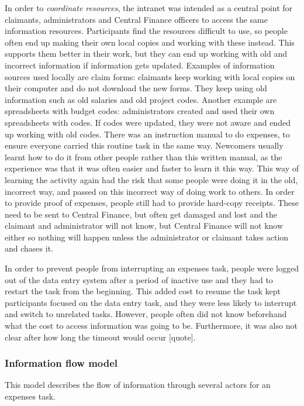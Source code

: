 In order to \textit{coordinate resources}, the intranet was intended as a central point for claimants, administrators and Central Finance officers to access the same information resources. Participants find the resources difficult to use, so people often end up making their own local copies and working with these instead. This supports them better in their work, but they can end up working with old and incorrect information if information gets updated. Examples of information sources used locally are claim forms: claimants keep working with local copies on their computer and do not download the new forms. They keep using old information such as old salaries and old project codes. Another example are spreadsheets with budget codes: administrators created and used their own spreadsheets with codes. If codes were updated, they were not aware and ended up working with old codes. 
There was an instruction manual to do expenses, to ensure everyone carried this routine task in the same way. Newcomers usually learnt how to do it from other people rather than this written manual, as the experience was that it was often easier and faster to learn it this way. This way of learning the activity again had the risk that some people were doing it in the old, incorrect way, and passed on this incorrect way of doing work to others.
In order to provide proof of expenses, people still had to provide hard-copy receipts. These need to be sent to Central Finance, but often get damaged and lost and the claimant and administrator will not know, but Central Finance will not know either so nothing will happen unless the administrator or claimant takes action and chases it. 

In order to prevent people from interrupting an expenses task, people were logged out of the data entry system after a period of inactive use and they had to restart the task from the beginning. This added cost to resume the task kept participants focused on the data entry task, and they were less likely to interrupt and switch to unrelated tasks. However, people often did not know beforehand what the cost to access information was going to be. Furthermore, it was also not clear after how long the timeout would occur [quote].

\subsubsection{Information flow model}
This model describes the flow of information through several actors for an expenses task.

